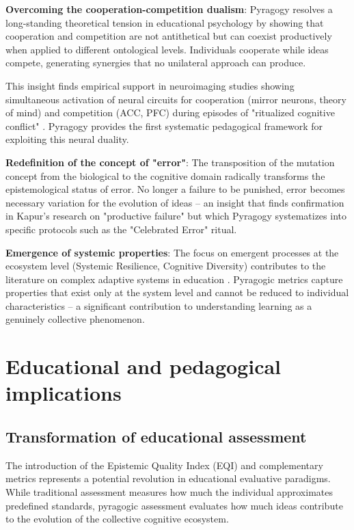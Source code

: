 \textbf{Overcoming the cooperation-competition dualism}:
Pyragogy resolves a long-standing theoretical tension in educational psychology by showing that cooperation and competition are not antithetical but can coexist productively when applied to different ontological levels. Individuals cooperate while ideas compete, generating synergies that no unilateral approach can produce.

This insight finds empirical support in neuroimaging studies showing simultaneous activation of neural circuits for cooperation (mirror neurons, theory of mind) and competition (ACC, PFC) during episodes of "ritualized cognitive conflict" \cite{Rilling2018}. Pyragogy provides the first systematic pedagogical framework for exploiting this neural duality.

\textbf{Redefinition of the concept of "error"}:
The transposition of the mutation concept from the biological to the cognitive domain radically transforms the epistemological status of error. No longer a failure to be punished, error becomes necessary variation for the evolution of ideas -- an insight that finds confirmation in Kapur's \cite{Kapur2008} research on "productive failure" but which Pyragogy systematizes into specific protocols such as the "Celebrated Error" ritual.

\textbf{Emergence of systemic properties}:
The focus on emergent processes at the ecosystem level (Systemic Resilience, Cognitive Diversity) contributes to the literature on complex adaptive systems in education \cite{Davis2004}. Pyragogic metrics capture properties that exist only at the system level and cannot be reduced to individual characteristics -- a significant contribution to understanding learning as a genuinely collective phenomenon.

\section{Educational and pedagogical implications}

\subsection{Transformation of educational assessment}

The introduction of the Epistemic Quality Index (EQI) and complementary metrics represents a potential revolution in educational evaluative paradigms. While traditional assessment measures how much the individual approximates predefined standards, pyragogic assessment evaluates how much ideas contribute to the evolution of the collective cognitive ecosystem.

